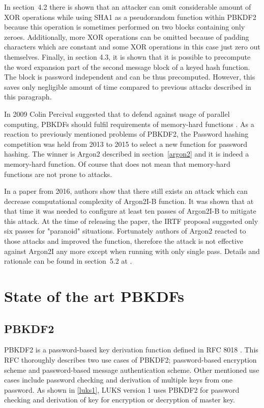 \documentclass[nolof]{fithesis3}
\begin{document}
In section~4.2 \parencite{pbkdf2weakness} there is shown that an attacker can omit considerable amount of XOR operations while using SHA1 as a pseudorandom function within PBKDF2 because this operation is sometimes performed on two blocks containing only zeroes. Additionally, more XOR operations can be omitted because of padding characters which are constant and some XOR operations in this case just zero out themselves. Finally, in section 4.3, it is shown that it is possible to precompute the word expansion part of the second message block of a keyed hash function. The block is password independent and can be thus precomputed. However, this saves only negligible amount of time compared to previous attacks described in this paragraph.

In 2009 Colin Percival suggested that to defend against usage of parallel computing, PBKDFs should fulfil requirements of memory-hard functions \parencite{memoryhard}. As a reaction to previously mentioned problems of PBKDF2, the Password hashing competition was held from 2013 to 2015 to select a new function for password hashing. The winner is Argon2 described in section~\ref{argon2} and it is indeed a memory-hard function. Of course that does not mean that memory-hard functions are not prone to attacks.

In a paper from 2016, authors show that there still exists an attack which can decrease computational complexity of Argon2I-B function. It was shown that at that time it was needed to configure at least ten passes of Argon2I-B to mitigate this attack. At the time of releasing the paper, the IRTF proposal suggested only six passes for "paranoid" situations. Fortunately authors of Argon2 reacted to those attacks and improved the function, therefore the attack is not effective against Argon2I any more except when running with only single pass. Details and rationale can be found in section~5.2 at \parencite{argon2}.

\chapter{State of the art PBKDFs}
\label{chap:pbkdfs}

\section{PBKDF2}
\label{sec:pbkdf2}
PBKDF2 is a password-based key derivation function defined in RFC 8018 \parencite{rfc8018}. This RFC thoroughly describes two use cases of PBKDF2; password-based encryption scheme and password-based message authentication scheme. Other mentioned use cases include password checking and derivation of multiple keys from one password. As shown in \ref{luks1}, LUKS version 1 uses PBKDF2 for password checking and derivation of key for encryption or decryption of master key.
\end{document}
